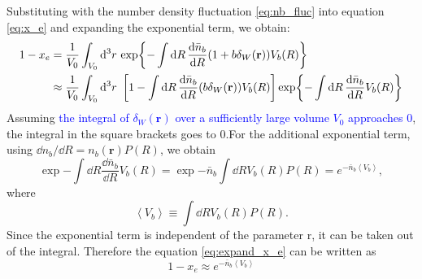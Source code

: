 	Substituting with the number density fluctuation  \eqref{eq:nb_fluc} into equation \eqref{eq:x_e} and expanding the exponential term, we obtain:
	\begin{align}
		1-x_e 
		&= 
		\dfrac{1}{V_0}
		\int_{V_0}\dd^3{r}
		~{\exp{
				-\int \dd{R}{
				\dfrac{
					\dd{\bar{n}_b}}{\dd{R}
				}
				(
					1+b\delta_W(\textbf{r})
				)V_b(R)}
			}
		}\notag\\
		&\approx
		\dfrac{1}{V_0}
		\int_{V_0}\dd^3{r}
		~\left[
			1-\int \dd{R}{
				\dfrac{
					\dd{\bar{n}_b}}{\dd{R}
				}
				(
				b\delta_W(\textbf{r})
				)V_b(R)}
		\right]
		\exp{
			-\int\dd{R}{
				\dfrac{
					\dd{\bar{n}_b}
					}{\dd{R}}
				V_b(R)
			}
		}
		\label{eq:expand_x_e}
	\end{align}
	Assuming \textcolor{blue}{the integral of $\delta_W(\textbf{r})$ over a sufficiently large volume $V_0$ approaches 0}, the integral in the square brackets goes to 0.For the additional exponential term, using ${\dd{n_b}}/{\dd {R}} = n_b(\textbf{r})P(R)$, we obtain
	\[
	\exp{
		-\int\dd{R}{
			\dfrac{
				\dd{\bar{n}_b}
			}{\dd{R}}
			V_b(R)
		}
	}=
	\exp{-\bar{n}_b\int\dd{R}{
		V_b(R)P(R)
	}}
	=e^{-\bar{n}_b\left<V_b\right>}
	,
	\]
	where 
	\[
	\left<V_b\right> \equiv \int\dd{R}{
		V_b(R)P(R)
	}.
	\]
	Since the exponential term is independent of the parameter r, it can be taken out of the integral. Therefore the equation \eqref{eq:expand_x_e} can be written as
	\begin{equation}
		1-x_e \approx e^{-\bar{n}_b\left<V_b\right>}
		\label{eq:1-x_e}
	\end{equation}	
	
